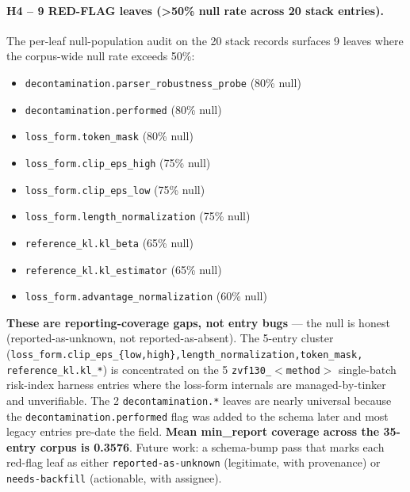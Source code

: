 \documentclass{article}
\begin{document}
\paragraph{H4 -- 9 RED-FLAG leaves (>50\% null rate across 20 stack entries).}
The per-leaf null-population audit on the 20 stack records surfaces 9 leaves
where the corpus-wide null rate exceeds 50\%:
\begin{itemize}\itemsep0pt
\item \texttt{decontamination.parser\_robustness\_probe} (80\% null)
\item \texttt{decontamination.performed} (80\% null)
\item \texttt{loss\_form.token\_mask} (80\% null)
\item \texttt{loss\_form.clip\_eps\_high} (75\% null)
\item \texttt{loss\_form.clip\_eps\_low} (75\% null)
\item \texttt{loss\_form.length\_normalization} (75\% null)
\item \texttt{reference\_kl.kl\_beta} (65\% null)
\item \texttt{reference\_kl.kl\_estimator} (65\% null)
\item \texttt{loss\_form.advantage\_normalization} (60\% null)
\end{itemize}
\textbf{These are reporting-coverage gaps, not entry bugs} --- the null is
honest (reported-as-unknown, not reported-as-absent). The 5-entry cluster
(\texttt{loss\_form.clip\_eps\_\{low,high\},length\_normalization,token\_mask,
reference\_kl.kl\_*}) is concentrated on the 5 \texttt{zvf130\_$<$method$>$}
single-batch risk-index harness entries where the loss-form internals are
managed-by-tinker and unverifiable. The 2 \texttt{decontamination.*} leaves are
nearly universal because the \texttt{decontamination.performed} flag was added
to the schema later and most legacy entries pre-date the field. \textbf{Mean
min\_report coverage across the 35-entry corpus is 0.3576}. Future work: a
schema-bump pass that marks each red-flag leaf as either
\texttt{reported-as-unknown} (legitimate, with provenance) or
\texttt{needs-backfill} (actionable, with assignee).
\end{document}
